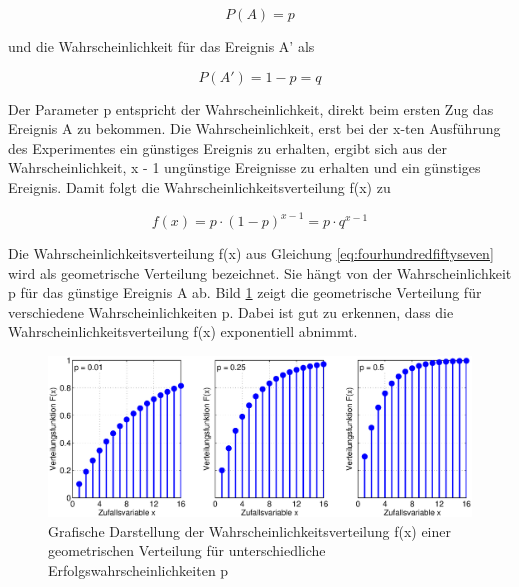 \begin{equation}\label{eq:fourhundredfiftyfive}
P(A)=p
\end{equation}

\noindent und die Wahrscheinlichkeit f\"{u}r das Ereignis A' als 

\begin{equation}\label{eq:fourhundredfiftysix}
P(A')=1-p=q
\end{equation}

\noindent Der Parameter p entspricht der Wahrscheinlichkeit, direkt beim ersten Zug das Ereignis A zu bekommen. Die Wahrscheinlichkeit, erst bei der x-ten Ausf\"{u}hrung des Experimentes ein g\"{u}nstiges Ereignis zu erhalten, ergibt sich aus der Wahrscheinlichkeit, x - 1 ung\"{u}nstige Ereignisse zu erhalten und ein g\"{u}nstiges Ereignis. Damit folgt die Wahrscheinlichkeitsverteilung f(x) zu

\begin{equation}\label{eq:fourhundredfiftyseven}
f(x)=p\cdot (1-p)^{x-1} =p\cdot q^{x-1}
\end{equation}

\noindent Die Wahrscheinlichkeitsverteilung f(x) aus Gleichung \eqref{eq:fourhundredfiftyseven} wird als geometrische Verteilung bezeichnet. Sie h\"{a}ngt von der Wahrscheinlichkeit p f\"{u}r das g\"{u}nstige Ereignis A ab. Bild \ref{fig:Diskret_Geometrische1} zeigt die geometrische Verteilung f\"{u}r verschiedene Wahrscheinlichkeiten p. Dabei ist gut zu erkennen, dass die Wahrscheinlichkeitsverteilung f(x) exponentiell abnimmt.

\clearpage

\noindent 
\begin{figure}[H]
  \centerline{\includegraphics[width=1\textwidth]{Kapitel4/Bilder/image19}}
  \caption{Grafische Darstellung der Wahrscheinlichkeitsverteilung f(x) einer geometrischen Verteilung f\"{u}r unterschiedliche Erfolgswahrscheinlichkeiten p}
  \label{fig:Diskret_Geometrische1}
\end{figure}


